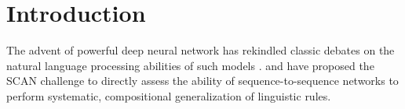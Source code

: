\section{Introduction}
The advent of powerful deep neural network has rekindled classic
debates on the natural language processing abilities of such models
\cite[e.g.,][]{Kirov:Cotterell:2018,Linzen:etal:2018,McCoy:etal:2018,Pater:2018}. \citet{Lake:Baroni:2017}
and \citet{Loula:etal:2018} have proposed the SCAN challenge to
directly assess the ability of sequence-to-sequence networks to
perform systematic, compositional generalization of linguistic rules.




